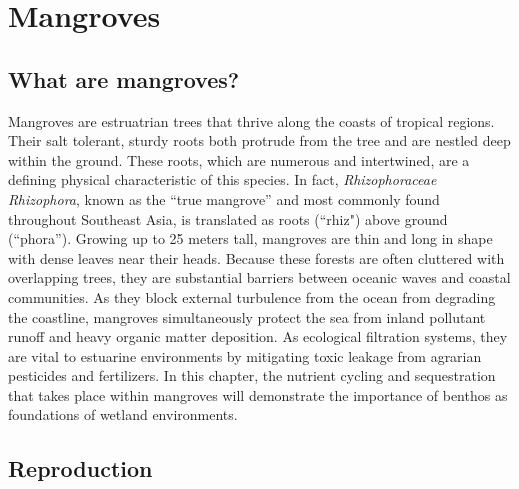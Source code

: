 \section{Mangroves}

\subsection{What are mangroves?}

  Mangroves are estruatrian trees that thrive along the coasts of tropical regions. Their salt tolerant, sturdy roots both protrude from the tree and are nestled deep within the ground. These roots, which are numerous and intertwined, are a defining physical characteristic of this species. In fact, \textit{Rhizophoraceae Rhizophora}, known as the ``true mangrove'' and most commonly found throughout Southeast Asia, is translated as roots (``rhiz") above ground (``phora''). Growing up to 25 meters tall, mangroves are thin and long in shape with dense leaves near their heads. Because these forests are often cluttered with overlapping trees, they are substantial barriers between oceanic waves and coastal communities. As they block external turbulence from the ocean from degrading the coastline, mangroves simultaneously protect the sea from inland pollutant runoff and heavy organic matter deposition.  As ecological filtration systems, they are vital to estuarine environments by mitigating toxic leakage from agrarian pesticides and fertilizers. In this chapter, the nutrient cycling and sequestration that takes place within mangroves will demonstrate the importance of benthos as foundations of wetland environments.




      
      
\subsection{Reproduction}

